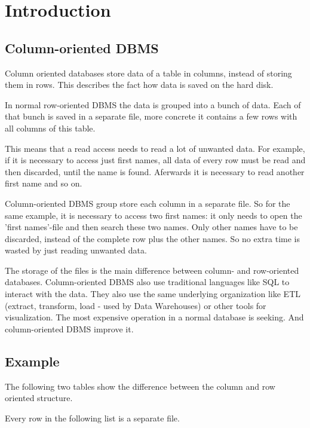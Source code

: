 
\chapter{Introduction}
\section{Column-oriented DBMS}

Column oriented databases store data of a table in columns, instead of storing them in rows. 
This describes the fact how data is saved on the hard disk.

In normal row-oriented DBMS the data is grouped into a bunch of data. 
Each of that bunch is saved in a separate file, more concrete it contains a few rows with all columns of this table. 
\cite{hbase.stavros.harizopoulos.2009}

This means that a read access needs to read a lot of unwanted data.
For example, if it is necessary to access just first names, all data of every row must be read and then discarded, until the name is found. 
Aferwards it is necessary to read another first name and so on. 
\cite{hbase.stavros.harizopoulos.2009}

Column-oriented DBMS group store each column in a separate file. 
So for the same example, it is necessary to access two first names: it only needs to open the 'first names'-file and then search these two names.
Only other names have to be discarded, instead of the complete row plus the other names.
So no extra time is wasted by just reading unwanted data.
\cite{hbase.daniel.abadi.2010}

The storage of the files is the main difference between column- and row-oriented databases.
Column-oriented DBMS also use traditional languages like SQL to interact with the data.
They also use the same underlying organization like ETL (extract, transform, load - used by Data Warehouses) or other tools for visualization.
\cite{hbase.amazon.2017}
The most expensive operation in a normal database is seeking. 
And column-oriented DBMS improve it.


\newpage

\section{Example}
The following two tables show the difference between the column and row oriented structure.

Every row in the following list is a separate file.

